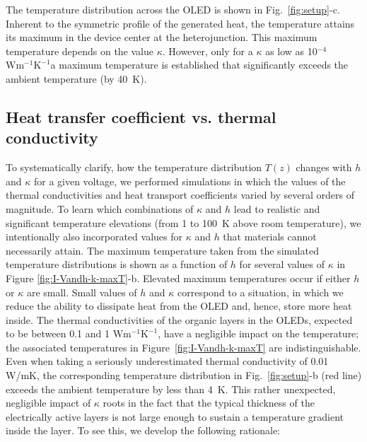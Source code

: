 \documentclass[%
9pt,
 aip,
rsi,%
 amsmath,amssymb,
preprint,%
]{revtex4-1}
\newcommand{\thermalconductivity}{$\mathrm{W m^{-1} K^{-1}}$}
\begin{document}
The temperature distribution across the OLED is shown in Fig.~\ref{fig:setup}-c. Inherent to the symmetric profile of the generated heat, the temperature attains its maximum in the device center at the heterojunction. This maximum temperature depends on the value $\kappa$. However, only for a $\kappa$ as low as 10$^{-4}$~\thermalconductivity a maximum temperature is established that significantly exceeds the ambient temperature (by 40~K).   

\subsection{Heat transfer coefficient vs. thermal conductivity}
To systematically clarify, how the temperature distribution $T(z)$ changes with $h$ and $\kappa$ for a given voltage, we performed simulations in which the values of the thermal conductivities and heat transport coefficients varied by several orders of magnitude. 
To learn which combinations of $\kappa$ and $h$ lead to realistic and significant temperature elevations (from 1 to 100~K above room temperature), we intentionally also incorporated values for $\kappa$ and $h$ that materials cannot necessarily attain.
The maximum temperature taken from the simulated temperature distributions is shown as a function of $h$ for several values of $\kappa$ in Figure \ref{fig:I-Vandh-k-maxT}-b. 
Elevated maximum temperatures occur if either $h$ or $\kappa$ are small. Small values of $h$ and $\kappa$ correspond to a situation, in which we reduce the ability to dissipate heat from the OLED and, hence, store more heat inside.
The thermal conductivities of the organic layers in the OLEDs, expected to be between 0.1 and 1 \thermalconductivity, have a negligible impact on the temperature; the associated temperatures in Figure~\ref{fig:I-Vandh-k-maxT} are indistinguishable.
Even when taking a seriously underestimated thermal conductivity of 0.01 W/mK, the corresponding temperature distribution in Fig.~\ref{fig:setup}-b (red line) exceeds the ambient temperature by less than 4~K. 
This rather unexpected, negligible impact of $\kappa$ roots in the fact that the typical thickness of the electrically active layers is not large enough to sustain a temperature gradient inside the layer. To see this, we develop the following rationale: 
\end{document}
